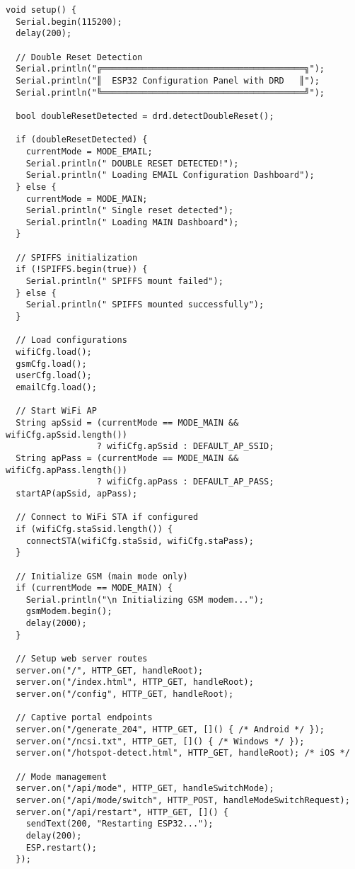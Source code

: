 \documentclass[11pt,a4paper]{article}
\begin{document}
\begin{verbatim}
void setup() {
  Serial.begin(115200);
  delay(200);
  
  // Double Reset Detection
  Serial.println("╔════════════════════════════════════════╗");
  Serial.println("║  ESP32 Configuration Panel with DRD   ║");
  Serial.println("╚════════════════════════════════════════╝");
  
  bool doubleResetDetected = drd.detectDoubleReset();
  
  if (doubleResetDetected) {
    currentMode = MODE_EMAIL;
    Serial.println(" DOUBLE RESET DETECTED!");
    Serial.println(" Loading EMAIL Configuration Dashboard");
  } else {
    currentMode = MODE_MAIN;
    Serial.println(" Single reset detected");
    Serial.println(" Loading MAIN Dashboard");
  }
  
  // SPIFFS initialization
  if (!SPIFFS.begin(true)) {
    Serial.println(" SPIFFS mount failed");
  } else {
    Serial.println(" SPIFFS mounted successfully");
  }
  
  // Load configurations
  wifiCfg.load();
  gsmCfg.load();
  userCfg.load();
  emailCfg.load();
  
  // Start WiFi AP
  String apSsid = (currentMode == MODE_MAIN && wifiCfg.apSsid.length()) 
                  ? wifiCfg.apSsid : DEFAULT_AP_SSID;
  String apPass = (currentMode == MODE_MAIN && wifiCfg.apPass.length()) 
                  ? wifiCfg.apPass : DEFAULT_AP_PASS;
  startAP(apSsid, apPass);
  
  // Connect to WiFi STA if configured
  if (wifiCfg.staSsid.length()) {
    connectSTA(wifiCfg.staSsid, wifiCfg.staPass);
  }
  
  // Initialize GSM (main mode only)
  if (currentMode == MODE_MAIN) {
    Serial.println("\n Initializing GSM modem...");
    gsmModem.begin();
    delay(2000);
  }
  
  // Setup web server routes
  server.on("/", HTTP_GET, handleRoot);
  server.on("/index.html", HTTP_GET, handleRoot);
  server.on("/config", HTTP_GET, handleRoot);
  
  // Captive portal endpoints
  server.on("/generate_204", HTTP_GET, []() { /* Android */ });
  server.on("/ncsi.txt", HTTP_GET, []() { /* Windows */ });
  server.on("/hotspot-detect.html", HTTP_GET, handleRoot); /* iOS */
  
  // Mode management
  server.on("/api/mode", HTTP_GET, handleSwitchMode);
  server.on("/api/mode/switch", HTTP_POST, handleModeSwitchRequest);
  server.on("/api/restart", HTTP_GET, []() {
    sendText(200, "Restarting ESP32...");
    delay(200);
    ESP.restart();
  });
  

\end{verbatim}
\end{document}
